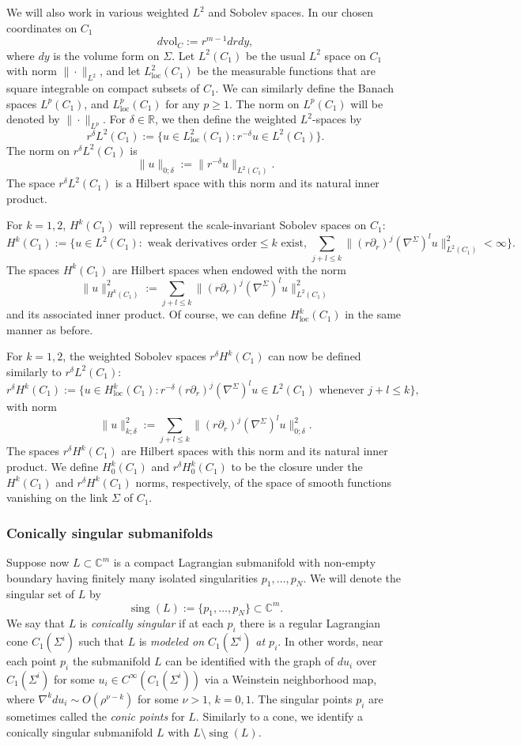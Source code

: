 \documentclass[11pt]{amsart}
\theoremstyle{definition}
\theoremstyle{remark}
\DeclareMathOperator{\sing}{sing}
\newcommand{\R}{\mathbb{R}}
\newcommand{\vol}{\mathrm{vol}}
\begin{document}
We will also work in various weighted $L^2$ and Sobolev spaces. In our chosen coordinates on $C_1$
\[d\vol_{C} := r^{m-1} dr dy,\]
where $dy$ is the volume form on $\Sigma$. Let $L^2(C_1)$ be the usual $L^2$ space on $C_1$ with norm $\|\cdot\|_{L^2}$, and let $L_{\text{loc}}^2(C_1)$ be the measurable functions that are square integrable on compact subsets of $C_1$. We can similarly define the Banach spaces $L^p(C_1)$, and $L_{\text{loc}}^p(C_1)$ for any $p \geq 1$. The norm on $L^p(C_1)$ will be denoted by $\|\cdot\|_{L^p}$. For $\delta \in \R$, we then define the weighted $L^2$-spaces by
\[r^\delta L^2(C_1) := \{ u  \in L_{\text{loc}}^2(C_1) : r^{-\delta} u \in L^2(C_1)\}.\]
The norm on $r^\delta L^2(C_1)$ is 
\[\|u\|_{0; \delta} := \|r^{-\delta}u\|_{L^2(C_1)}.\]
The space $r^\delta L^2(C_1)$ is a Hilbert space with this norm and its natural inner product. 

For $k = 1,2$, $H^k(C_1)$ will represent the scale-invariant Sobolev spaces on $C_1$:  
\[H^k(C_1) := \Big\{u \in L^2(C_1) : \text{ weak derivatives order} \leq k \text{ exist, } \sum_{j + l \leq k} \|(r\partial_r)^j(\nabla^\Sigma)^lu\|_{L^2(C_1)}^2 < \infty\Big\}.\]
The spaces $H^k(C_1)$ are Hilbert spaces when endowed with the norm
\[\|u\|_{H^k(C_1)}^2 := \sum_{j + l \leq k} \|(r\partial_r)^j(\nabla^\Sigma)^lu\|_{L^2(C_1)}^2\]
and its associated inner product. Of course, we can define $H_{\text{loc}}^k(C_1)$ in the same manner as before.

For $k = 1,2$, the weighted Sobolev spaces $r^\delta H^k(C_1)$ can now be defined similarly to $r^\delta L^2(C_1)$:
\[r^\delta H^k(C_1) := \{u \in H_{\text{loc}}^k(C_1) : r^{-\delta}(r \partial_r)^j(\nabla^\Sigma)^lu \in L^2(C_1) \text{ whenever } j + l \leq k\},\]
with norm
\[\|u\|_{k; \delta}^2 := \sum_{j + l \leq k} \|(r \partial_r)^j(\nabla^\Sigma)^lu\|_{0;\delta}^2.\]
The spaces $r^\delta H^k(C_1)$ are Hilbert spaces with this norm and its natural inner product. We define $H_0^k(C_1)$ and $r^\delta H_0^k(C_1)$ to be the closure under the $H^k(C_1)$ and $r^\delta H^k(C_1)$ norms, respectively, of the space of smooth functions vanishing on the link $\Sigma$ of $C_1$.

\subsubsection{Conically singular submanifolds}
Suppose now $L \subset \mathbb{C}^m$ is a compact Lagrangian submanifold with non-empty boundary having finitely many isolated singularities $p_1,\ldots, p_N$. We will denote the singular set of $L$ by
\[\sing(L) := \{p_1,\ldots, p_N\} \subset \mathbb{C}^m.\]
We say that $L$ is \emph{conically singular} if at each $p_i$ there is a regular Lagrangian cone $C_1(\Sigma^i)$ such that $L$ is \emph{modeled on $C_1(\Sigma^i)$ at $p_i$}. In other words, near each point $p_i$ the submanifold $L$ can be identified with the graph of $du_i$ over $C_1(\Sigma^i)$ for some $u_i \in C^\infty(C_1(\Sigma^i))$ via a Weinstein neighborhood map, where $\nabla^k du_i \sim O(\rho^{\nu - k})$ for some $\nu > 1$, $k = 0,1$. The singular points $p_i$ are sometimes called the \emph{conic points} for $L$. Similarly to a cone, we identify a conically singular submanifold $L$ with $L \setminus \sing(L)$. 
\end{document}
